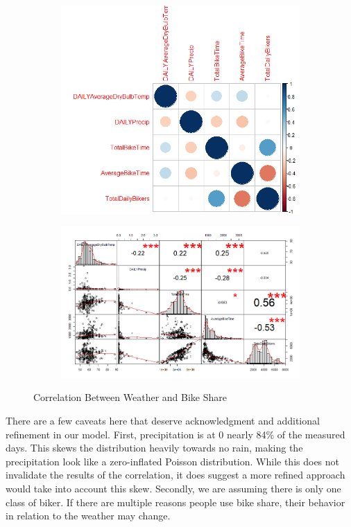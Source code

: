 \documentclass{report}
\begin{document}
\begin{figure}[h!]
	\begin{subfigure}[b]{0.5\linewidth}
		\includegraphics[width=\linewidth]{Corrrelation.png}
	\end{subfigure}
	\begin{subfigure}[b]{0.5\linewidth}
		\includegraphics[width=\linewidth]{CorrScatter.png}
	\end{subfigure}
	\caption{Correlation Between Weather and Bike Share}
	\label{fig:AllCorr}
\end{figure}


	There are a few caveats here that deserve acknowledgment and additional refinement in our model. First, precipitation is at 0 nearly 84\% of the measured days. This skews the distribution heavily towards no rain, making the precipitation look like a zero-inflated Poisson distribution. While this does not invalidate the results of the correlation, it does suggest a more refined approach would take into account this skew. Secondly, we are assuming there is only one class of biker. If there are multiple reasons people use bike share, their behavior in relation to the weather may change.
\end{document}
